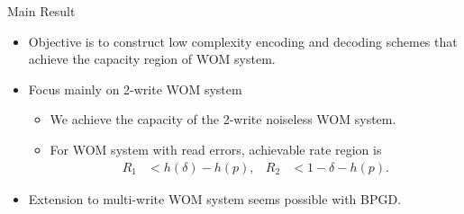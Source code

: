 \documentclass{beamer}
\newlength{\onecolwid}
\newlength{\itemspace}
\begin{document}
\begin{frame}
\begin{columns}[t]
\begin{column}{\onecolwid}
    \vspace{2cm}
    \begin{alertblock}{\Large Main Result}
        \begin{itemize} 
        \item Objective is to construct low complexity encoding and decoding schemes that achieve the capacity region of WOM system.
        \item \vspace{\itemspace} Focus mainly on 2-write WOM system
        \begin{itemize}
			\item \vspace{\itemspace} We achieve the capacity of the 2-write noiseless WOM system.
			\item \vspace{\itemspace} For WOM system with read errors, achievable rate region is 
			    \begin{align*}
    		      R_1 &< h(\delta) - h(p), & R_2 &< 1 - \delta - h(p) .
	        \end{align*}
        \end{itemize}        
      \item \vspace{\itemspace}Extension to multi-write WOM system seems possible with BPGD.
      \end{itemize}
    \end{alertblock}


\end{column}
\end{columns}
\end{frame}
\end{document}
